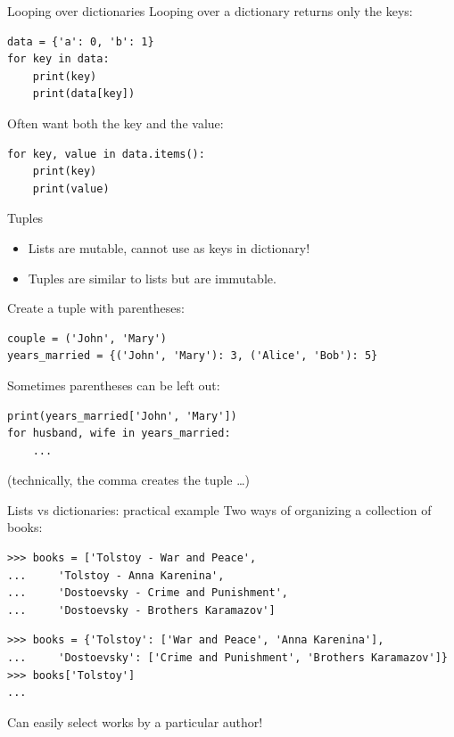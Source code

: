\documentclass[aspectratio=169,usenames,dvipsnames]{beamer}
\begin{document}
\begin{frame}[fragile]{Looping over dictionaries}
Looping over a dictionary returns only the keys:
\begin{lstlisting}
data = {'a': 0, 'b': 1}
for key in data:
    print(key)
    print(data[key])
\end{lstlisting}

\pause
Often want both the key and the value:
\begin{lstlisting}
for key, value in data.items():
    print(key)
    print(value)
\end{lstlisting}
\end{frame}

\begin{frame}[fragile]{Tuples}
    \begin{itemize}
        \item Lists are mutable, cannot use as keys in dictionary!
        \item Tuples are similar to lists but are immutable.
    \end{itemize}
Create a tuple with parentheses:

\begin{lstlisting}
couple = ('John', 'Mary')
years_married = {('John', 'Mary'): 3, ('Alice', 'Bob'): 5}
\end{lstlisting}

\pause
Sometimes parentheses can be left out:
\begin{lstlisting}
print(years_married['John', 'Mary'])
for husband, wife in years_married:
    ...
\end{lstlisting}

(technically, the comma creates the tuple \dots)
\end{frame}

\begin{frame}[fragile]{Lists vs dictionaries: practical example}
Two ways of organizing a collection of books:
\begin{lstlisting}
>>> books = ['Tolstoy - War and Peace',
...     'Tolstoy - Anna Karenina',
...     'Dostoevsky - Crime and Punishment',
...     'Dostoevsky - Brothers Karamazov']
\end{lstlisting}

\pause
\begin{lstlisting}
>>> books = {'Tolstoy': ['War and Peace', 'Anna Karenina'],
...     'Dostoevsky': ['Crime and Punishment', 'Brothers Karamazov']}
>>> books['Tolstoy']
...
\end{lstlisting}
Can easily select works by a particular author!
\end{frame}
\end{document}
